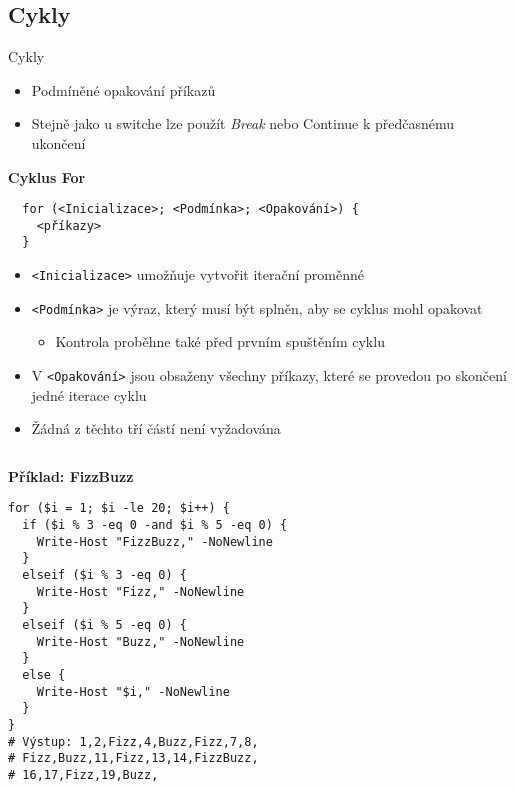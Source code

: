 \documentclass[main.tex]{subfiles}
\begin{document}
\subsection{Cykly}
\begin{frame}{Cykly}
  \begin{itemize}
    \item Podmíněné opakování příkazů
    \item Stejně jako u switche lze použít \textit{Break} nebo {Continue} k předčasnému ukončení 
  \end{itemize}
  
  \textbf{Cyklus For}

  \begin{center}
      \begin{verbatim}
  for (<Inicializace>; <Podmínka>; <Opakování>) {
    <příkazy>
  }
    \end{verbatim}
  \end{center}
  \begin{itemize}
    \item \texttt{<Inicializace>} umožňuje vytvořit iterační proměnné
    \item \texttt{<Podmínka>} je výraz, který musí být splněn, aby se cyklus mohl opakovat
      \begin{itemize}
        \item Kontrola proběhne také před prvním spuštěním cyklu
      \end{itemize}
    \item V \texttt{<Opakování>} jsou obsaženy všechny příkazy, které se provedou po skončení jedné iterace cyklu
      \item Žádná z těchto tří částí není vyžadována
  \end{itemize}
  \framebreak
  \begin{columns}[t]
    \begin{column}{0.6\textwidth}
      \textbf{Příklad: FizzBuzz}
    \begin{verbatim}
for ($i = 1; $i -le 20; $i++) {
  if ($i % 3 -eq 0 -and $i % 5 -eq 0) {
    Write-Host "FizzBuzz," -NoNewline
  }
  elseif ($i % 3 -eq 0) {
    Write-Host "Fizz," -NoNewline
  }
  elseif ($i % 5 -eq 0) {
    Write-Host "Buzz," -NoNewline
  }
  else {
    Write-Host "$i," -NoNewline
  }
}
# Výstup: 1,2,Fizz,4,Buzz,Fizz,7,8,
# Fizz,Buzz,11,Fizz,13,14,FizzBuzz,
# 16,17,Fizz,19,Buzz,
  \end{verbatim}
    \end{column}

\end{columns}
\end{frame}
\end{document}
